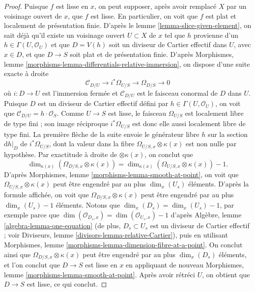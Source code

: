 \begin{proof}
Puisque $f$ est lisse en $x$, on peut supposer, après avoir remplacé $X$ par un voisinage
ouvert de $x$, que $f$ est lisse. En particulier, on voit que
$f$ est plat et localement de présentation finie. D'après le
lemme \ref{lemma-slice-given-element},
on sait déjà qu'il existe un voisinage ouvert $U \subset X$ de $x$
tel que $h$ provienne d'un $h \in \Gamma(U, \mathcal{O}_U)$ et
que $D = V(h)$ soit un diviseur de Cartier effectif dans $U$, avec $x \in D$, et que
$D \to S$ soit plat et de présentation finie. D'après
Morphismes, lemme \ref{morphisms-lemma-differentials-relative-immersion},
on dispose d'une suite exacte à droite
$$
\mathcal{C}_{D/U} \to i^*\Omega_{U/S} \to \Omega_{D/S} \to 0
$$
où $i : D \to U$ est l'immersion fermée et $\mathcal{C}_{D/U}$
est le faisceau conormal de $D$ dans $U$. Puisque $D$ est un diviseur de Cartier
effectif défini par $h \in \Gamma(U, \mathcal{O}_U)$, on voit que
$\mathcal{C}_{D/U} = h \cdot \mathcal{O}_S$. Comme $U \to S$ est lisse,
le faisceau $\Omega_{U/S}$ est localement libre de type fini ; son image réciproque
$i^*\Omega_{U/S}$ est donc elle aussi localement libre de type fini. La première flèche de
la suite envoie le générateur libre $h$ sur la section $\text{d}h|_D$
de $i^*\Omega_{U/S}$, dont la valeur dans la fibre
$\Omega_{U/S, x} \otimes \kappa(x)$ est non nulle par hypothèse. Par exactitude à droite
de $\otimes \kappa(x)$, on conclut que
$$
\dim_{\kappa(x)} \left( \Omega_{D/S, x} \otimes \kappa(x) \right)
=
\dim_{\kappa(x)} \left( \Omega_{U/S, x} \otimes \kappa(x) \right) - 1.
$$
D'après
Morphismes, lemme \ref{morphisms-lemma-smooth-at-point},
on voit que $\Omega_{U/S, x} \otimes \kappa(x)$ peut être engendré par
au plus $\dim_x(U_s)$ éléments. D'après la formule affichée, on voit que
$\Omega_{D/S, x} \otimes \kappa(x)$ peut être engendré par au plus
$\dim_x(U_s) - 1$ éléments. Notons que
$\dim_x(D_s) = \dim_x(U_s) - 1$, par exemple parce que
$\dim(\mathcal{O}_{D_s, x}) = \dim(\mathcal{O}_{U_s, x}) - 1$ d'après
Algèbre, lemme \ref{algebra-lemma-one-equation}
(de plus, $D_s \subset U_s$ est un diviseur de Cartier effectif ; voir
Diviseurs, lemme \ref{divisors-lemma-relative-Cartier}),
puis en utilisant
Morphismes, lemme \ref{morphisms-lemma-dimension-fibre-at-a-point}.
On conclut ainsi que $\Omega_{D/S, x} \otimes \kappa(x)$ peut être engendré
par au plus $\dim_x(D_s)$ éléments, et l'on conclut que $D \to S$
est lisse en $x$ en appliquant de nouveau
Morphismes, lemme \ref{morphisms-lemma-smooth-at-point}.
Après avoir rétréci $U$, on obtient que $D \to S$ est lisse, ce qui conclut.
\end{proof}

